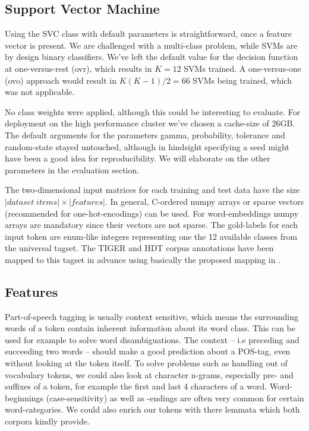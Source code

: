 \documentclass[11pt,a4paper]{article}
\begin{document}
\subsection{Support Vector Machine}
Using the SVC class with default parameters is straightforward, once a feature vector is present. We are challenged with a multi-class problem, while SVMs are by design binary classifiers. We've left the default value for the decision function at one-versus-rest (ovr), which results in $K = 12$ SVMs trained. A one-versus-one (ovo) approach would result in $K(K-1)/2 = 66$ SVMs being trained, which was not applicable.

No class weights were applied, although this could be interesting to evaluate. For deployment on the high performance cluster we've chosen a cache-size of 26GB. The default arguments for the parameters gamma, probability, tolerance and random-state stayed untouched, although in hindsight specifying a seed might have been a good idea for reproducibility. We will elaborate on the other parameters in the evaluation section.

The two-dimensional input matrices for each training and test data have the size $|dataset\;items| \times |features|$. In general, C-ordered numpy arrays or sparse vectors (recommended for one-hot-encodings) can be used. For word-embeddings numpy arrays are mandatory since their vectors are not sparse. The gold-labels for each input token are enum-like integers representing one the 12 available classes from the universal tagset. The TIGER and HDT corpus annotations have been mapped to this tagset in advance using basically the proposed mapping in \cite{univmap}.


\subsection{Features}
Part-of-speech tagging is usually context sensitive, which means the surrounding words of a token contain inherent information about its word class. This can be used for example to solve word disambiguations. The context -- i.e preceding and succeeding two words -- should make a good prediction about a POS-tag, even without looking at the token itself. To solve problems such as handling out of vocabulary tokens, we could also look at character n-grams, especially pre- and suffixes of a token, for example the first and last 4 characters of a word. Word-beginnings (case-sensitivity) as well as -endings are often very common for certain word-categories. We could also enrich our tokens with there lemmata which both corpora kindly provide.
\end{document}
